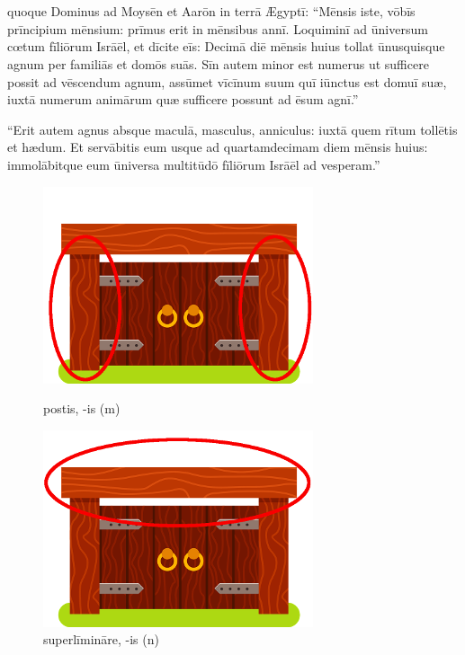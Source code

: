 \chapter{}


\thispagestyle{empty}

 quoque Dominus ad Moysēn et Aarōn in terrā
Ægyptī: ``Mēnsis iste, vōbīs prīncipium mēnsium: prīmus erit in mēnsibus
annī. Loquiminī ad ūniversum cœtum fīliōrum Isrāēl, et
dīcite eīs: Decimā diē mēnsis huius tollat ūnusquisque agnum per familiās
et domōs suās. Sīn autem minor est numerus ut sufficere
possit ad vēscendum agnum, assūmet vīcīnum suum quī iūnctus est domuī suæ, iuxtā numerum
animārum quæ sufficere possunt ad ēsum agnī.''

``Erit autem agnus absque
maculā,
masculus, anniculus:
iuxtā quem rītum
tollētis et hædum. Et
servābitis eum usque ad quartamdecimam diem mēnsis huius:
immolābitque eum ūniversa multitūdō
fīliōrum Isrāēl ad vesperam.''

\begin{figure}[h!]
    \begin{minipage}[hp]{0.5\linewidth}
        \centering
        \includegraphics{postis}
        \caption{postis, -is (m)}
    \end{minipage}%
    \begin{minipage}[hp]{0.5\linewidth}
        \centering
        \includegraphics{superlimen}
        \caption{superlīmināre, -is (n)}
    \end{minipage}
\end{figure}

